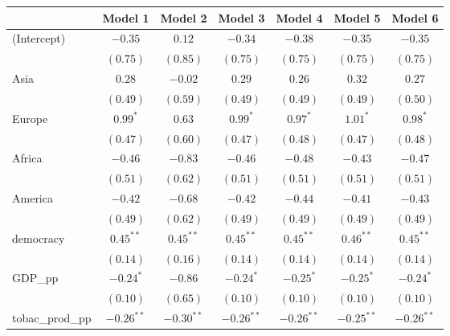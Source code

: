 
\begin{table}[!h]
\begin{center}
\begin{tabular}{l c c c c c c }
\toprule
 & Model 1 & Model 2 & Model 3 & Model 4 & Model 5 & Model 6 \\
\midrule
(Intercept)             & $-0.35$      & $0.12$       & $-0.34$      & $-0.38$      & $-0.35$      & $-0.35$      \\
                        & $(0.75)$     & $(0.85)$     & $(0.75)$     & $(0.75)$     & $(0.75)$     & $(0.75)$     \\
Asia                    & $0.28$       & $-0.02$      & $0.29$       & $0.26$       & $0.32$       & $0.27$       \\
                        & $(0.49)$     & $(0.59)$     & $(0.49)$     & $(0.49)$     & $(0.49)$     & $(0.50)$     \\
Europe                  & $0.99^{*}$   & $0.63$       & $0.99^{*}$   & $0.97^{*}$   & $1.01^{*}$   & $0.98^{*}$   \\
                        & $(0.47)$     & $(0.60)$     & $(0.47)$     & $(0.48)$     & $(0.47)$     & $(0.48)$     \\
Africa                  & $-0.46$      & $-0.83$      & $-0.46$      & $-0.48$      & $-0.43$      & $-0.47$      \\
                        & $(0.51)$     & $(0.62)$     & $(0.51)$     & $(0.51)$     & $(0.51)$     & $(0.51)$     \\
America                 & $-0.42$      & $-0.68$      & $-0.42$      & $-0.44$      & $-0.41$      & $-0.43$      \\
                        & $(0.49)$     & $(0.62)$     & $(0.49)$     & $(0.49)$     & $(0.49)$     & $(0.49)$     \\
democracy               & $0.45^{**}$  & $0.45^{**}$  & $0.45^{**}$  & $0.45^{**}$  & $0.46^{**}$  & $0.45^{**}$  \\
                        & $(0.14)$     & $(0.16)$     & $(0.14)$     & $(0.14)$     & $(0.14)$     & $(0.14)$     \\
GDP\_pp                 & $-0.24^{*}$  & $-0.86$      & $-0.24^{*}$  & $-0.25^{*}$  & $-0.25^{*}$  & $-0.24^{*}$  \\
                        & $(0.10)$     & $(0.65)$     & $(0.10)$     & $(0.10)$     & $(0.10)$     & $(0.10)$     \\
tobac\_prod\_pp         & $-0.26^{**}$ & $-0.30^{**}$ & $-0.26^{**}$ & $-0.26^{**}$ & $-0.25^{**}$ & $-0.26^{**}$ \\

\end{tabular}
\end{center}
\end{table}
